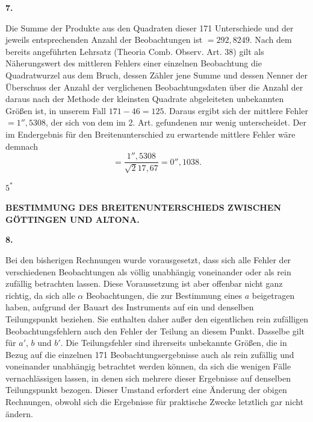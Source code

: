 \begin{center}\textbf{7.}\end{center}

Die Summe der Produkte aus den Quadraten dieser 171 Unterschiede und
der jeweils entsprechenden Anzahl der Beobachtungen ist \(=292{,}8249\). Nach
dem bereits angeführten Lehrsatz (Theoria Comb. Observ. Art. 38) gilt als
Näherungswert des mittleren Fehlers einer einzelnen Beobachtung die
Quadratwurzel aus dem Bruch, dessen Zähler jene Summe und dessen Nenner
der Überschuss der Anzahl der verglichenen Beobachtungsdaten über die Anzahl
der daraus nach der Methode der kleinsten Quadrate abgeleiteten unbekannten
Größen ist, in unserem Fall \(171-46=125\). Daraus ergibt sich der mittlere Fehler
\(=1''{,}5308\), der sich von dem im 2. Art. gefundenen nur wenig unterscheidet.
Der im Endergebnis für den Breitenunterschied zu erwartende mittlere Fehler
wäre demnach
\[
=\frac{1''{,}5308}{\surd 217{,}67}=0''{,}1038.
\]
\par\vfill
\noindent\hfill \(5^{*}\)\hspace{.12\textwidth}\par

\par\clearpage
\noindent{}\parbox[t]{\dimexpr\linewidth-24mm\relax}{\centering\scriptsize\bfseries BESTIMMUNG DES BREITENUNTERSCHIEDS ZWISCHEN GÖTTINGEN UND ALTONA.}\makebox[12mm][r]{}\par\medskip

\begin{center}\textbf{8.}\end{center}

Bei den bisherigen Rechnungen wurde vorausgesetzt, dass sich alle Fehler
der verschiedenen Beobachtungen als völlig unabhängig voneinander oder
als rein zufällig betrachten lassen. Diese Voraussetzung ist aber offenbar
nicht ganz richtig, da sich alle \(\alpha\) Beobachtungen, die zur Bestimmung
eines \(a\) beigetragen haben, aufgrund der Bauart des Instruments auf ein und
denselben Teilungspunkt beziehen. Sie enthalten daher außer den eigentlichen
rein zufälligen Beobachtungsfehlern auch den Fehler der Teilung an diesem
Punkt. Dasselbe gilt für \(a'\), \(b\) und \(b'\). Die Teilungsfehler sind ihrerseits
unbekannte Größen, die in Bezug auf die einzelnen 171 Beobachtungsergebnisse
auch als rein zufällig und voneinander unabhängig betrachtet werden können,
da sich die wenigen Fälle vernachlässigen lassen, in denen sich mehrere
dieser Ergebnisse auf denselben Teilungspunkt bezogen. Dieser Umstand
erfordert eine Änderung der obigen Rechnungen,
obwohl sich die Ergebnisse für praktische
Zwecke letztlich gar nicht ändern.

